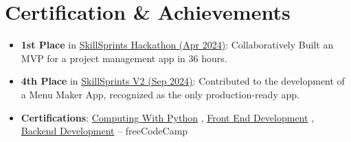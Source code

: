 \documentclass[letterpaper,11pt]{article}
\newcommand{\achievementItem}[1]{
  \item\small{
    {#1 \vspace{-6pt}}
  }
}
\begin{document}
\section{Certification \& Achievements}
    \begin{itemize}[leftmargin=0.2in]
      \achievementItem{\textbf{1st Place} in \href{https://www.linkedin.com/events/skillsprintshackathon-sparkbyst7186758085367980032/}{SkillSprints Hackathon (Apr 2024)}: Collaboratively Built an MVP for a project management app in 36 hours.}
      \achievementItem{\textbf{4th Place} in \href{https://www.linkedin.com/events/skillsprintsv2-thehackathond-da7236585518937829377/}{SkillSprints V2 (Sep 2024)}: Contributed to the development of a Menu Maker App, recognized as the only production-ready app.}
      \achievementItem{\textbf{Certifications}: \href{https://www.freecodecamp.org/certification/Bhavjit/scientific-computing-with-python-v7}{Computing With Python} , \href{https://www.freecodecamp.org/certification/Bhavjit/front-end-development-libraries}{Front End Development} , \href{https://www.freecodecamp.org/certification/Bhavjit/back-end-development-and-apis}{Backend Development} – freeCodeCamp}
      
    \end{itemize}




\end{document}
